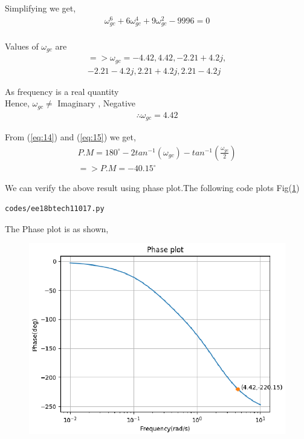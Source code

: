 \begin{enumerate}[label=\thesection.\arabic*.,ref=\thesection.\theenumi]
Simplifying we get,
\begin{align}
\omega_{gc}^{6}+6\omega_{gc}^{4}+9\omega_{gc}^{2}-9996=0 
\end{align}
\\
Values of $\omega_{gc}$ are 
\begin{align}
=> \omega_{gc}=-4.42,4.42,-2.21+4.2j, \\
-2.21-4.2j,2.21+4.2j,2.21-4.2j
\end{align}

As frequency is a real quantity
\\Hence, $\omega_{gc} \neq$ Imaginary , Negative
\begin{align}
\therefore  \omega_{gc} = 4.42  \label{eq:15} 
\end{align}

From (\ref{eq:14}) and (\ref{eq:15}) we get,
\begin{align}
P.M=180^{\circ}-2tan^{-1}(\omega_{gc})-tan^{-1}(\frac{\omega_{gc}}{2}) \\
=> P.M=-40.15^{\circ}
\end{align}

We can verify the above result using phase plot.The following code plots Fig(\ref{fig:ee18btech11017_3})
\begin{lstlisting}
codes/ee18btech11017.py
\end{lstlisting}
The Phase plot is as shown,
\begin{figure}[!h]
  \includegraphics[width=\columnwidth]{./figures/ee18btech11017_3.eps}
  \caption{}
  \label{fig:ee18btech11017_3}
\end{figure}


\end{enumerate}
